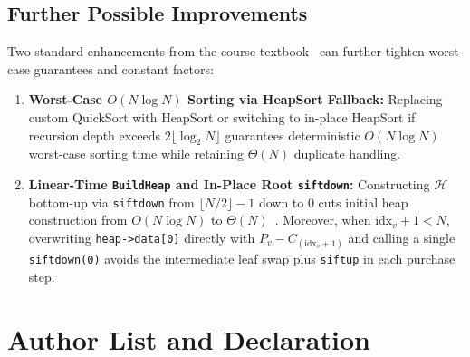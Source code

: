 \documentclass[10pt, a4paper]{article}
\newcommand{\code}[1]{\texttt{\color{primary!90!black}#1}}
\newcommand{\id}[1]{\ensuremath{\mathrm{#1}}}
\begin{document}
\subsection{Further Possible Improvements}
Two standard enhancements from the course textbook~\cite{weiss1996} can further tighten worst-case guarantees and constant factors:
\begin{enumerate}[label=\textbf{\color{primary}\arabic*.}]
  \item \textbf{Worst-Case $O(N \log N)$ Sorting via HeapSort Fallback:} Replacing custom QuickSort with HeapSort or switching to in-place HeapSort if recursion depth exceeds $2\lfloor \log_2 N \rfloor$ guarantees deterministic $O(N \log N)$ worst-case sorting time while retaining $\Theta(N)$ duplicate handling.
  \item \textbf{Linear-Time \code{BuildHeap} and In-Place Root \code{siftdown}:} Constructing $\mathcal{H}$ bottom-up via \code{siftdown} from $\lfloor N/2 \rfloor - 1$ down to $0$ cuts initial heap construction from $O(N \log N)$ to $\Theta(N)$~\cite{weiss1996}. Moreover, when $\id{idx}_v + 1 < N$, overwriting \code{heap->data[0]} directly with $P_v - C_{(\id{idx}_v + 1)}$ and calling a single \code{siftdown(0)} avoids the intermediate leaf swap plus \code{siftup} in each purchase step.
\end{enumerate}

\clearpage

\section*{Author List and Declaration}
\end{document}
